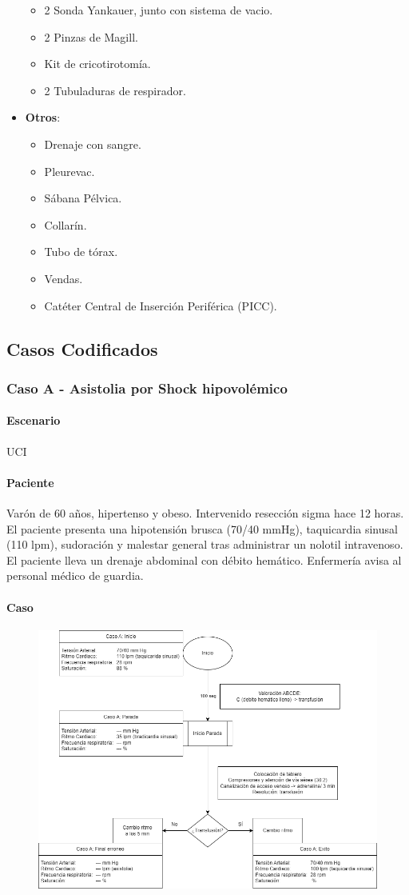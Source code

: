 \begin{itemize}[topsep=0pt, partopsep=0pt,itemsep=0pt,parsep=0pt]
\begin{itemize}[topsep=0pt, partopsep=0pt,itemsep=0pt,parsep=0pt]
        \item 2 Sonda Yankauer, junto con sistema de vacio.
        \item 2 Pinzas de Magill.
        \item Kit de cricotirotomía.
        \item 2 Tubuladuras de respirador.
    \end{itemize}
    \item \textbf{Otros}:
    \begin{itemize}[topsep=0pt, partopsep=0pt,itemsep=0pt,parsep=0pt]
        \item Drenaje con sangre.
        \item Pleurevac.
        \item Sábana Pélvica.
        \item Collarín.
        \item Tubo de tórax.
        \item Vendas.
        \item Catéter Central de Inserción Periférica (PICC).
    \end{itemize}
\end{itemize}
\subsection{Casos Codificados}
\subsubsection{Caso A - Asistolia por Shock hipovolémico}
\paragraph{Escenario} UCI
\paragraph{Paciente} Varón de 60 años, hipertenso y obeso. Intervenido resección sigma hace 12 horas. El paciente presenta una hipotensión brusca (70/40 mmHg), taquicardia sinusal (110 lpm), sudoración y malestar general tras administrar un nolotil intravenoso. El paciente lleva un drenaje abdominal con débito hemático. Enfermería avisa al personal médico de guardia.
\paragraph{Caso} 
\begin{figure}[hptb]
    \centering
	\includegraphics[width=.7\linewidth]{./imagenes/ACV-AdSC-CasosUCI_CasoA.png}
\end{figure}


